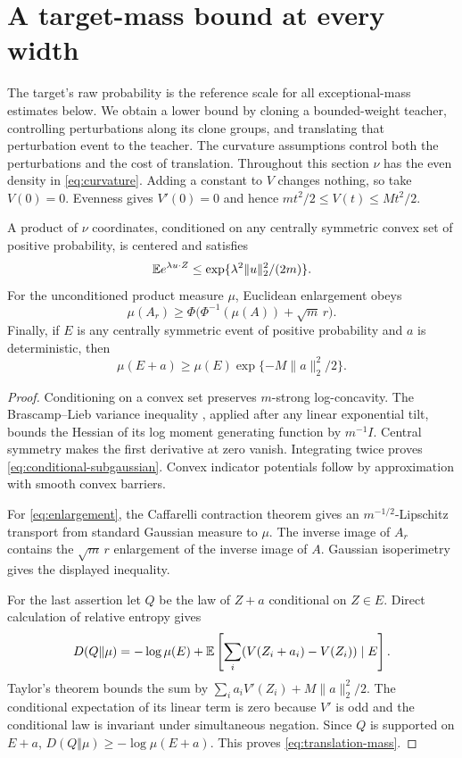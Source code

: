 \section{A target-mass bound at every width}\label{sec:target-mass}
The target's raw probability is the reference scale for all exceptional-mass
estimates below. We obtain a lower bound by cloning a bounded-weight
teacher, controlling perturbations along its clone groups, and translating
that perturbation event to the teacher. The curvature assumptions control
both the perturbations and the cost of translation.
Throughout this section $\nu$ has the even density in
\eqref{eq:curvature}. Adding a constant to $V$ changes nothing, so take
$V(0)=0$. Evenness gives $V'(0)=0$ and hence
$m t^2/2\leq V(t)\leq Mt^2/2$.

\begin{lemma}\label{lem:concentration}
A product of $\nu$ coordinates, conditioned on any centrally symmetric
convex set of positive probability, is centered and satisfies
\begin{equation}\label{eq:conditional-subgaussian}
 \mathbb E e^{\lambda u\cdot Z}\leq
        \exp\{\lambda^2\|u\|_2^2/(2m)\}.
\end{equation}
For the unconditioned product measure $\mu$, Euclidean enlargement obeys
\begin{equation}\label{eq:enlargement}
 \mu(A_r)\geq\Phi\bigl(\Phi^{-1}(\mu(A))+\sqrt m\,r\bigr).
\end{equation}
Finally, if $E$ is any centrally symmetric event of positive probability
and $a$ is deterministic, then
\begin{equation}\label{eq:translation-mass}
 \mu(E+a)\geq\mu(E)\exp\{-M\|a\|_2^2/2\}.
\end{equation}
\end{lemma}
\begin{proof}
Conditioning on a convex set preserves $m$-strong log-concavity. The
Brascamp--Lieb variance inequality \cite{brascamp-lieb}, applied after
any linear exponential tilt, bounds the Hessian of its log moment
generating function by $m^{-1}I$. Central symmetry makes the first
derivative at zero vanish. Integrating twice proves
\eqref{eq:conditional-subgaussian}. Convex indicator potentials follow
by approximation with smooth convex barriers.

For \eqref{eq:enlargement}, the Caffarelli contraction theorem
\cite{caffarelli} gives an $m^{-1/2}$-Lipschitz transport from standard
Gaussian measure to $\mu$. The inverse image of $A_r$ contains the
$\sqrt m\,r$ enlargement of the inverse image of $A$. Gaussian
isoperimetry \cite{ledoux} gives the displayed inequality.

For the last assertion let $Q$ be the law of $Z+a$ conditional on
$Z\in E$. Direct calculation of relative entropy gives
\[
 D(Q\Vert\mu)=-\log\mu(E)
 +\mathbb E\left[\sum_i(V(Z_i+a_i)-V(Z_i))\mid E\right].
\]
Taylor's theorem bounds the sum by
$\sum_i a_i V'(Z_i)+M\|a\|_2^2/2$. The conditional expectation of
its linear term is zero because $V'$ is odd and the conditional law is
invariant under simultaneous negation. Since $Q$ is supported on $E+a$,
$D(Q\Vert\mu)\geq-\log\mu(E+a)$. This proves
\eqref{eq:translation-mass}.
\end{proof}

